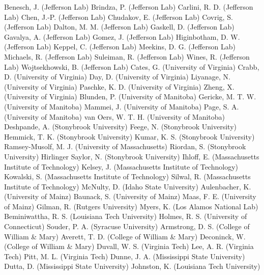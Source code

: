 Benesch, J. (Jefferson Lab)
Brindza, P. (Jefferson Lab)
Carlini, R. D. (Jefferson Lab)
Chen, J.-P. (Jefferson Lab)
Chudakov, E. (Jefferson Lab)
Covrig, S. (Jefferson Lab)
Dalton, M. M. (Jefferson Lab)
Gaskell, D. (Jefferson Lab)
Gavalya, A. (Jefferson Lab)
Gomez, J. (Jefferson Lab)
Higinbotham, D. W. (Jefferson Lab)
Keppel, C. (Jefferson Lab)
Meekins, D. G. (Jefferson Lab)
Michaels, R. (Jefferson Lab)
Suleiman, R. (Jefferson Lab)
Wines, R. (Jefferson Lab)
Wojtsekhowski, B. (Jefferson Lab)
Cates, G. (University of Virginia)
Crabb, D. (University of Virginia)
Day, D. (University of Virginia)
Liyanage, N. (University of Virginia)
Paschke, K. D. (University of Virginia)
Zheng, X. (University of Virginia)
Blunden, P. (University of Manitoba)
Gericke, M. T. W. (University of Manitoba)
Mammei, J. (University of Manitoba)
Page, S. A. (University of Manitoba)
van Oers, W. T. H. (University of Manitoba)
Deshpande, A. (Stonybrook University)
Feege, N. (Stonybrook University)
Hemmick, T. K. (Stonybrook University)
Kumar, K. S. (Stonybrook University)
Ramsey-Musolf, M. J. (University of Massachusetts)
Riordan, S. (Stonybrook University)
Hirlinger Saylor, N. (Stonybrook University)
Ihloff, E. (Massachusetts Institute of Technology)
Kelsey, J. (Massachusetts Institute of Technology)
Kowalski, S. (Massachusetts Institute of Technology)
Silwal, R. (Massachusetts Institute of Technology)
McNulty, D. (Idaho State University)
Aulenbacher, K. (University of Mainz)
Baunack, S. (University of Mainz)
Maas, F. E. (University of Mainz)
Gilman, R. (Rutgers University)
Myers, K. (Los Alamos National Lab)
Beminiwattha, R. S. (Louisiana Tech University)
Holmes, R. S. (University of Connecticut)
Souder, P. A. (Syracuse University)
Armstrong, D. S. (College of William \& Mary)
Averett, T. D. (College of William \& Mary)
Deconinck, W. (College of William \& Mary)
Duvall, W. S. (Virginia Tech)
Lee, A. R. (Virginia Tech)
Pitt, M. L. (Virginia Tech)
Dunne, J. A. (Mississippi State University)
Dutta, D. (Mississippi State University)
Johnston, K. (Louisiana Tech University)
